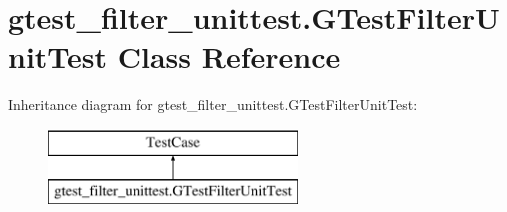\hypertarget{classgtest__filter__unittest_1_1_g_test_filter_unit_test}{}\section{gtest\+\_\+filter\+\_\+unittest.\+G\+Test\+Filter\+Unit\+Test Class Reference}
\label{classgtest__filter__unittest_1_1_g_test_filter_unit_test}
Inheritance diagram for gtest\+\_\+filter\+\_\+unittest.\+G\+Test\+Filter\+Unit\+Test\+:\begin{figure}[H]
\begin{center}
\leavevmode
\includegraphics[height=2.000000cm]{classgtest__filter__unittest_1_1_g_test_filter_unit_test}
\end{center}
\end{figure}

